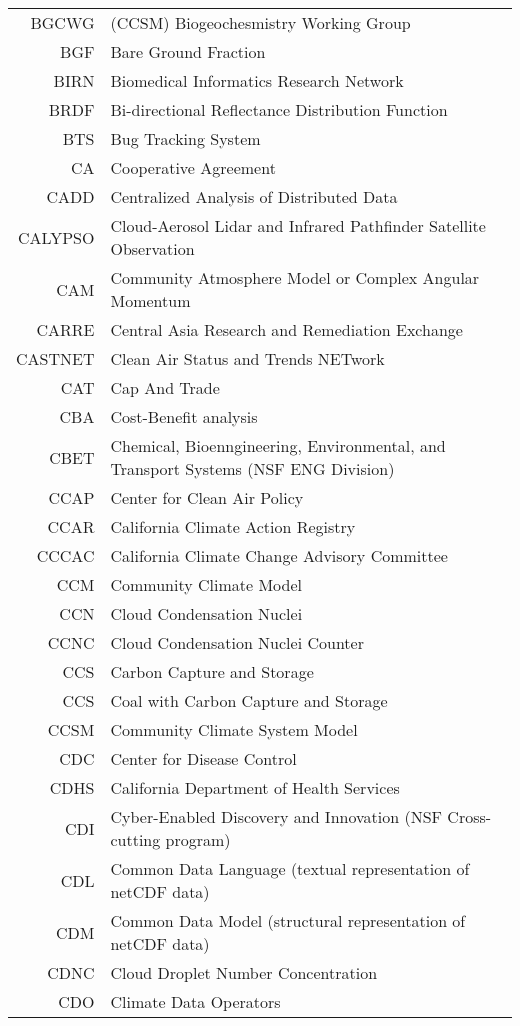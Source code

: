\documentclass[12pt,twoside]{article}
\begin{document}
\begin{longtable}[>{\bfseries}l]{>{\ttfamily}r l}
BGCWG & (CCSM) Biogeochesmistry Working Group \\
BGF & Bare Ground Fraction \\
BIRN & Biomedical Informatics Research Network \\
BRDF & Bi-directional Reflectance Distribution Function \\
BTS & Bug Tracking System \\
CA & Cooperative Agreement \\
CADD & Centralized Analysis of Distributed Data \\
CALYPSO & Cloud-Aerosol Lidar and Infrared Pathfinder Satellite Observation \\
CAM & Community Atmosphere Model or Complex Angular Momentum \\
CARRE & Central Asia Research and Remediation Exchange \\
CASTNET & Clean Air Status and Trends NETwork \\
CAT & Cap And Trade \\
CBA & Cost-Benefit analysis \\
CBET & Chemical, Bioenngineering, Environmental, and Transport Systems (NSF ENG Division) \\
CCAP & Center for Clean Air Policy \\
CCAR & California Climate Action Registry \\
CCCAC & California Climate Change Advisory Committee \\
CCM & Community Climate Model \\
CCN & Cloud Condensation Nuclei \\
CCNC & Cloud Condensation Nuclei Counter \\ 
CCS & Carbon Capture and Storage \\
CCS & Coal with Carbon Capture and Storage \\
CCSM & Community Climate System Model \\
CDC & Center for Disease Control \\
CDHS & California Department of Health Services \\
CDI & Cyber-Enabled Discovery and Innovation (NSF Cross-cutting program) \\
CDL & Common Data Language (textual representation of netCDF data) \\
CDM & Common Data Model (structural representation of netCDF data) \\
CDNC & Cloud Droplet Number Concentration \\
CDO & Climate Data Operators \\

\end{longtable}
\end{document}
